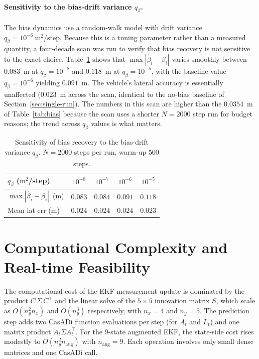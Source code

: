 \documentclass[11pt,a4paper]{article}
\begin{document}
\paragraph{Sensitivity to the bias-drift variance $q_\beta$.}
The bias dynamics use a random-walk model with drift variance
$q_\beta=10^{-6}~\mathrm{m}^2/\text{step}$. Because this is a tuning
parameter rather than a measured quantity, a four-decade scan was run
to verify that bias recovery is not sensitive to the exact choice.
Table~\ref{tab:qbias-scan} shows that $\max|\hat\beta_i-\beta_i|$
varies smoothly between $0.083$~m at $q_\beta=10^{-8}$ and $0.118$~m
at $q_\beta=10^{-5}$, with the baseline value $q_\beta=10^{-6}$
yielding $0.091$~m. The vehicle's lateral accuracy is essentially
unaffected ($0.023$~m across the scan, identical to the no-bias
baseline of Section~\ref{sec:single-run}). The numbers in this scan
are higher than the $0.0354$~m of Table~\ref{tab:bias} because the
scan uses a shorter $N=2000$ step run for budget reasons; the trend
across $q_\beta$ values is what matters.

\begin{table}[!htbp]
\centering
\caption{Sensitivity of bias recovery to the bias-drift variance
$q_\beta$. $N=2000$ steps per run, warm-up $500$ steps.}
\label{tab:qbias-scan}
\begin{tabular}{@{}lcccc@{}}
\toprule
$q_\beta$ ($\mathrm{m}^2$/step) & $10^{-8}$ & $10^{-7}$ & $10^{-6}$
                                & $10^{-5}$\\
\midrule
$\max|\hat\beta_i-\beta_i|$~(m) & $0.083$ & $0.084$ & $0.091$
                                & $0.118$\\
Mean lat err (m)                & $0.024$ & $0.024$ & $0.024$
                                & $0.023$\\
\bottomrule
\end{tabular}
\end{table}

\FloatBarrier
\section{Computational Complexity and Real-time Feasibility}
\label{sec:complexity}

The computational cost of the EKF measurement update is dominated by
the product $C\,\Sigma\,C^{\!\top}$ and the linear solve of the
$5\times5$ innovation matrix $S$, which scale as $O(n_y^2 n_x)$ and
$O(n_y^3)$ respectively, with $n_x=4$ and $n_y=5$. The prediction step
adds two CasADi function evaluations per step (for $A_t$ and $L_t$)
and one matrix product $A_t\Sigma A_t^{\!\top}$. For the $9$-state
augmented EKF, the state-side cost rises modestly to
$O(n_y^2 n_\text{aug})$ with $n_\text{aug}=9$. Each operation
involves only small dense matrices and one CasADi call.
\end{document}

